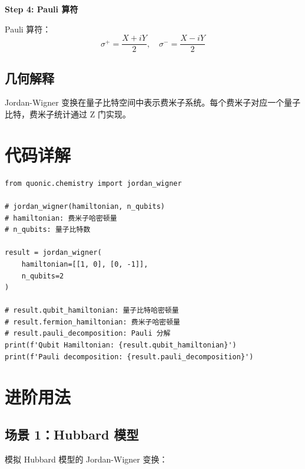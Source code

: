 \documentclass[12pt,a4paper]{article}
\begin{document}
\textbf{Step 4: Pauli 算符}

Pauli 算符：
\begin{equation}
\sigma^+ = \frac{X + iY}{2}, \quad \sigma^- = \frac{X - iY}{2}
\end{equation}

\subsection{几何解释}

Jordan-Wigner 变换在量子比特空间中表示费米子系统。每个费米子对应一个量子比特，费米子统计通过 Z 门实现。

\section{代码详解}

\begin{verbatim}
from quonic.chemistry import jordan_wigner

# jordan_wigner(hamiltonian, n_qubits)
# hamiltonian: 费米子哈密顿量
# n_qubits: 量子比特数

result = jordan_wigner(
    hamiltonian=[[1, 0], [0, -1]],
    n_qubits=2
)

# result.qubit_hamiltonian: 量子比特哈密顿量
# result.fermion_hamiltonian: 费米子哈密顿量
# result.pauli_decomposition: Pauli 分解
print(f'Qubit Hamiltonian: {result.qubit_hamiltonian}')
print(f'Pauli decomposition: {result.pauli_decomposition}')
\end{verbatim}

\section{进阶用法}

\subsection{场景 1：Hubbard 模型}

模拟 Hubbard 模型的 Jordan-Wigner 变换：
\end{document}
